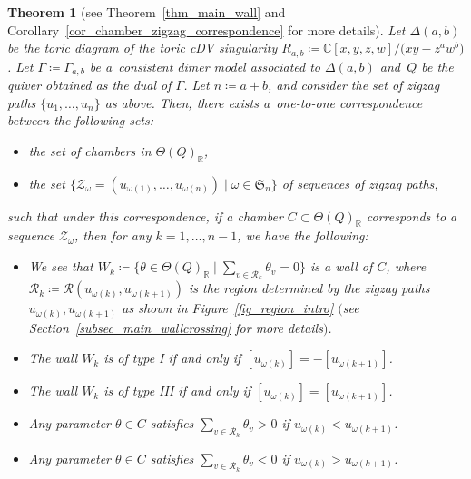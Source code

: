 \documentclass[pdftex]{sigma}
\numberwithin{equation}{section}
\newtheorem{Theorem}{Theorem}[section]
\theoremstyle{definition}
\newcommand{\RR}{\mathbb{R}}
\newcommand{\CC}{\mathbb{C}}
\newcommand{\calR}{\mathcal{R}}
\newcommand{\calZ}{\mathcal{Z}}
\newcommand{\fkS}{\mathfrak{S}}
\newcommand{\typeIII}{{\rm I\hspace{-0.7pt}I\hspace{-0.7pt}I}}
\newcommand{\permII}{\omega}
\begin{document}
\begin{Theorem}[{see Theorem~\ref{thm_main_wall} and Corollary~\ref{cor_chamber_zigzag_correspondence} for more details}]
\label{thm_summary_main}
Let $\Delta(a,b)$ be the toric diagram of the toric cDV singularity $R_{a,b}\coloneqq\CC[x,y,z,w]/\bigl(xy-z^aw^b\bigr)$.
Let $\Gamma\coloneqq\Gamma_{a,b}$ be a~consistent dimer model associated to $\Delta(a,b)$
and~$Q$ be the quiver obtained as the dual of $\Gamma$.
Let $n\coloneqq a+b$, and consider the set of zigzag paths $\{u_1, \dots, u_n\}$ as above.
Then, there exists a~one-to-one correspondence between the following sets:
\begin{itemize}\itemsep=0pt
\item[$(a)$] the set of chambers in $\Theta(Q)_\RR$,
\item[$(b)$] the set $\{\calZ_\permII=(u_{\permII(1)}, \dots, u_{\permII(n)}) \mid \permII\in\fkS_n\}$ of sequences of zigzag paths,
\end{itemize}
such that under this correspondence, if a chamber $C\subset\Theta(Q)_\RR$ corresponds to a sequence $\calZ_\permII$,
then for any $k=1, \dots, n-1$, we have the following:
\begin{itemize}\itemsep=0pt
\item[$(1)\hphantom{{}'}$]
We see that $W_{k}\coloneqq\bigl\{\theta\in\Theta(Q)_\RR \mid \sum_{v\in \calR_k}\theta_v=0\bigr\}$ is a wall of $C$, where $\calR_k\coloneqq\calR(u_{\permII(k)},\allowbreak u_{\permII(k+1)})$ is the region determined by the zigzag paths $u_{\permII(k)}, u_{\permII(k+1)}$ as shown in Figure~{\rm \ref{fig_region_intro}} $($see Section~{\rm \ref{subsec_main_wallcrossing}} for more details$)$.
\item[$(2)\hphantom{{}'}$] The wall $W_k$ is of type {\rm I} if and only if $[u_{\permII(k)}]= -[u_{\permII(k+1)}]$.
\item[$(2)'$] The wall $W_k$ is of type {\typeIII} if and only if $[u_{\permII(k)}]=[u_{\permII(k+1)}]$.
\item[$(3)\hphantom{{}'}$] Any parameter $\theta\in C$ satisfies $\sum_{v\in \calR_k}\theta_v>0$ if $u_{\permII(k)}< u_{\permII(k+1)}$.
\item[$(3)'$] Any parameter $\theta\in C$ satisfies $\sum_{v\in \calR_k}\theta_v<0$ if $u_{\permII(k)}> u_{\permII(k+1)}$.
\end{itemize}
\end{Theorem}
\end{document}
